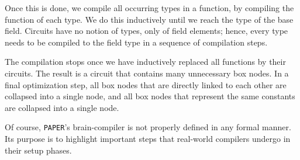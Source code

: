 Once this is done, we compile all occurring types in a function, by compiling the function of each type. We do this inductively until we reach the type of the base field. Circuits have no notion of types, only of field elements; hence, every type needs to be compiled to the field type in a sequence of compilation steps.

The compilation stops once we have inductively replaced all functions by their circuits. The result is a circuit that contains many unnecessary box nodes. In a final optimization step, all box nodes that are directly linked to each other are collapsed into a single node, and all box nodes that represent the same constants are collapsed into a single node. 

Of course, \texttt{PAPER}'s brain-compiler is not properly defined in any formal manner. Its purpose is to highlight important steps that real-world compilers undergo in their setup phases. 
